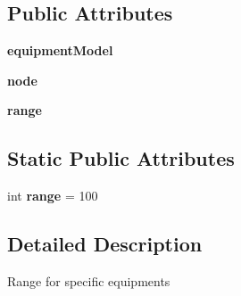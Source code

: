 \subsection*{Public Attributes}
\begin{DoxyCompactItemize}
\item 
\hypertarget{classmininet_1_1wifiDevices_1_1deviceRange_ab7caf7221bd5cb4ca0cab747a68d85a7}{{\bfseries equipment\-Model}}\label{classmininet_1_1wifiDevices_1_1deviceRange_ab7caf7221bd5cb4ca0cab747a68d85a7}

\item 
\hypertarget{classmininet_1_1wifiDevices_1_1deviceRange_a341daacf0384625393be41b701980325}{{\bfseries node}}\label{classmininet_1_1wifiDevices_1_1deviceRange_a341daacf0384625393be41b701980325}

\item 
\hypertarget{classmininet_1_1wifiDevices_1_1deviceRange_a43f07302f4cc265a635475d9ba8e6a2c}{{\bfseries range}}\label{classmininet_1_1wifiDevices_1_1deviceRange_a43f07302f4cc265a635475d9ba8e6a2c}

\end{DoxyCompactItemize}
\subsection*{Static Public Attributes}
\begin{DoxyCompactItemize}
\item 
\hypertarget{classmininet_1_1wifiDevices_1_1deviceRange_a755e774fe66ffe18f7838ac107531f2a}{int {\bfseries range} = 100}\label{classmininet_1_1wifiDevices_1_1deviceRange_a755e774fe66ffe18f7838ac107531f2a}

\end{DoxyCompactItemize}


\subsection{Detailed Description}
\begin{DoxyVerb}Range for specific equipments \end{DoxyVerb}
 

